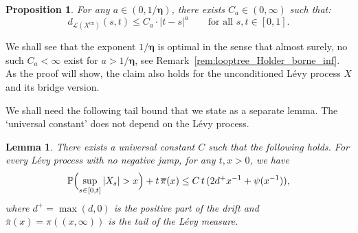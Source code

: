 \documentclass[british, a4paper,11pt]{article}
\numberwithin{equation}{section}
\newtheorem{lem}[thm]{Lemma}
\newtheorem{prop}[thm]{Proposition}
\theoremstyle{definition}
\renewcommand{\P}{\mathop{}\!\mathbb{P}}
\newcommand{\Loop}{\mathscr{L}}
\newcommand{\bdeta}{\boldsymbol{\eta}}
\newcommand{\exc}{\mathrm{ex}}
\begin{document}
\begin{prop}\label{prop:looptree_Holder_borne_sup}
For any $a \in(0, 1/\bdeta)$, 
there exists $C_{a} \in (0, \infty)$ such that:
\begin{equation}\label{eq:looptree_Holder}
d_{\Loop(X^{\exc})}(s,t) \leq C_{a} \cdot |t-s|^{a}
\qquad\text{for all }s,t \in [0,1].
\end{equation}
\end{prop}

We shall see that the exponent $1/\bdeta$ is optimal in the sense that almost surely, no such $C_a<\infty$ exist for $a > 1/\bdeta$, see Remark~\ref{rem:looptree_Holder_borne_inf}.
As the proof will show, the claim also holds for the unconditioned L\'evy process $X$ and its bridge version.


We shall need the following tail bound that we state as a separate lemma.
The `universal constant' does not depend on the L\'evy process.


\begin{lem}\label{lem:ineq_max_Levy}
There exists a universal constant $C$ such that the following holds.
For every L\'evy process with no negative jump, for any $t,x > 0$, we have
\[\P\Bigl(\sup_{s \in [0,t]} |X_{s}| > x\Bigr) + t\, \overline{\pi}(x) \leq C\, t\, (2d^+ x^{-1} + \psi(x^{-1})),\]
where $d^+ = \max(d,0)$ is the positive part of the drift and $\overline{\pi}(x) = \pi((x,\infty))$ is the tail of the L\'evy measure.
\end{lem}
\end{document}
